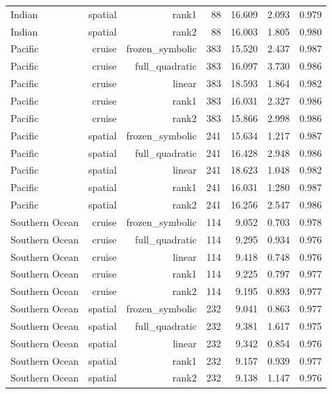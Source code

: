 \begin{longtable}{lrrrrrr}
Indian & spatial & rank1 & 88 & 16.609 & 2.093 & 0.979 \\
Indian & spatial & rank2 & 88 & 16.003 & 1.805 & 0.980 \\
Pacific & cruise & frozen\_symbolic & 383 & 15.520 & 2.437 & 0.987 \\
Pacific & cruise & full\_quadratic & 383 & 16.097 & 3.730 & 0.986 \\
Pacific & cruise & linear & 383 & 18.593 & 1.864 & 0.982 \\
Pacific & cruise & rank1 & 383 & 16.031 & 2.327 & 0.986 \\
Pacific & cruise & rank2 & 383 & 15.866 & 2.998 & 0.986 \\
Pacific & spatial & frozen\_symbolic & 241 & 15.634 & 1.217 & 0.987 \\
Pacific & spatial & full\_quadratic & 241 & 16.428 & 2.948 & 0.986 \\
Pacific & spatial & linear & 241 & 18.623 & 1.048 & 0.982 \\
Pacific & spatial & rank1 & 241 & 16.031 & 1.280 & 0.987 \\
Pacific & spatial & rank2 & 241 & 16.256 & 2.547 & 0.986 \\
Southern Ocean & cruise & frozen\_symbolic & 114 & 9.052 & 0.703 & 0.978 \\
Southern Ocean & cruise & full\_quadratic & 114 & 9.295 & 0.934 & 0.976 \\
Southern Ocean & cruise & linear & 114 & 9.418 & 0.748 & 0.976 \\
Southern Ocean & cruise & rank1 & 114 & 9.225 & 0.797 & 0.977 \\
Southern Ocean & cruise & rank2 & 114 & 9.195 & 0.893 & 0.977 \\
Southern Ocean & spatial & frozen\_symbolic & 232 & 9.041 & 0.863 & 0.977 \\
Southern Ocean & spatial & full\_quadratic & 232 & 9.381 & 1.617 & 0.975 \\
Southern Ocean & spatial & linear & 232 & 9.342 & 0.854 & 0.976 \\
Southern Ocean & spatial & rank1 & 232 & 9.157 & 0.939 & 0.977 \\
Southern Ocean & spatial & rank2 & 232 & 9.138 & 1.147 & 0.976 \\
\end{longtable}
